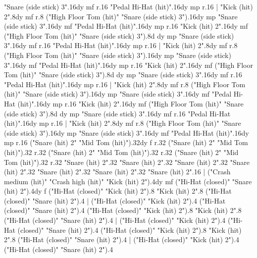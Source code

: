       "Snare (side stick) 3".16{dy mf}
      r.16
      "Pedal Hi-Hat (hit)".16{dy mp}
      r.16
    |
      "Kick (hit) 2".8{dy mf}
      r.8
      ("High Floor Tom (hit)" "Snare (side stick) 3").16{dy mp}
      "Snare (side stick) 3".16{dy mf}
      "Pedal Hi-Hat (hit)".16{dy mp}
      r.16
      "Kick (hit) 2".16{dy mf}
      ("High Floor Tom (hit)" "Snare (side stick) 3").8{d dy mp}
      "Snare (side stick) 3".16{dy mf}
      r.16
      "Pedal Hi-Hat (hit)".16{dy mp}
      r.16
    |
      "Kick (hit) 2".8{dy mf}
      r.8
      ("High Floor Tom (hit)" "Snare (side stick) 3").16{dy mp}
      "Snare (side stick) 3".16{dy mf}
      "Pedal Hi-Hat (hit)".16{dy mp}
      r.16
      "Kick (hit) 2".16{dy mf}
      ("High Floor Tom (hit)" "Snare (side stick) 3").8{d dy mp}
      "Snare (side stick) 3".16{dy mf}
      r.16
      "Pedal Hi-Hat (hit)".16{dy mp}
      r.16
    |
      "Kick (hit) 2".8{dy mf}
      r.8
      ("High Floor Tom (hit)" "Snare (side stick) 3").16{dy mp}
      "Snare (side stick) 3".16{dy mf}
      "Pedal Hi-Hat (hit)".16{dy mp}
      r.16
      "Kick (hit) 2".16{dy mf}
      ("High Floor Tom (hit)" "Snare (side stick) 3").8{d dy mp}
      "Snare (side stick) 3".16{dy mf}
      r.16
      "Pedal Hi-Hat (hit)".16{dy mp}
      r.16
    |
      "Kick (hit) 2".8{dy mf}
      r.8
      ("High Floor Tom (hit)" "Snare (side stick) 3").16{dy mp}
      "Snare (side stick) 3".16{dy mf}
      "Pedal Hi-Hat (hit)".16{dy mp}
      r.16
      ("Snare (hit) 2" "Mid Tom (hit)").32{dy f}
      r.32
      ("Snare (hit) 2" "Mid Tom (hit)").32
      r.32
      ("Snare (hit) 2" "Mid Tom (hit)").32
      r.32
      ("Snare (hit) 2" "Mid Tom (hit)").32
      r.32
      "Snare (hit) 2".32
      "Snare (hit) 2".32
      "Snare (hit) 2".32
      "Snare (hit) 2".32
      "Snare (hit) 2".32
      "Snare (hit) 2".32
      "Snare (hit) 2".16
    |
      ("Crash medium (hit)" "Crash high (hit)" "Kick (hit) 2").4{dy mf}
      ("Hi-Hat (closed)" "Snare (hit) 2").4{dy f}
      ("Hi-Hat (closed)" "Kick (hit) 2").8
      "Kick (hit) 2".8
      ("Hi-Hat (closed)" "Snare (hit) 2").4
    |
      ("Hi-Hat (closed)" "Kick (hit) 2").4
      ("Hi-Hat (closed)" "Snare (hit) 2").4
      ("Hi-Hat (closed)" "Kick (hit) 2").8
      "Kick (hit) 2".8
      ("Hi-Hat (closed)" "Snare (hit) 2").4
    |
      ("Hi-Hat (closed)" "Kick (hit) 2").4
      ("Hi-Hat (closed)" "Snare (hit) 2").4
      ("Hi-Hat (closed)" "Kick (hit) 2").8
      "Kick (hit) 2".8
      ("Hi-Hat (closed)" "Snare (hit) 2").4
    |
      ("Hi-Hat (closed)" "Kick (hit) 2").4
      ("Hi-Hat (closed)" "Snare (hit) 2").4

